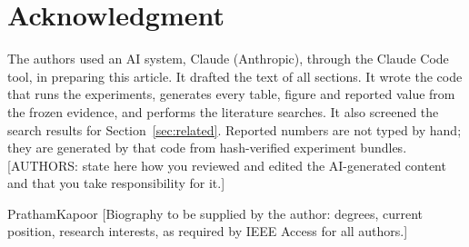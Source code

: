 \documentclass{ieeeaccess}
\begin{document}
\section*{Acknowledgment}
The authors used an AI system, Claude (Anthropic), through the Claude Code tool, in
preparing this article. It drafted the text of all sections. It wrote the code that
runs the experiments, generates every table, figure and reported value from the
frozen evidence, and performs the literature searches. It also screened the search
results for Section~\ref{sec:related}. Reported numbers are not typed by hand; they
are generated by that code from hash-verified experiment bundles.
[AUTHORS: state here how you reviewed and edited the AI-generated content and that
you take responsibility for it.]




\begin{IEEEbiographynophoto}{PrathamKapoor}
[Biography to be supplied by the author: degrees, current position, research
interests, as required by IEEE Access for all authors.]
\end{IEEEbiographynophoto}

\EOD
\end{document}
